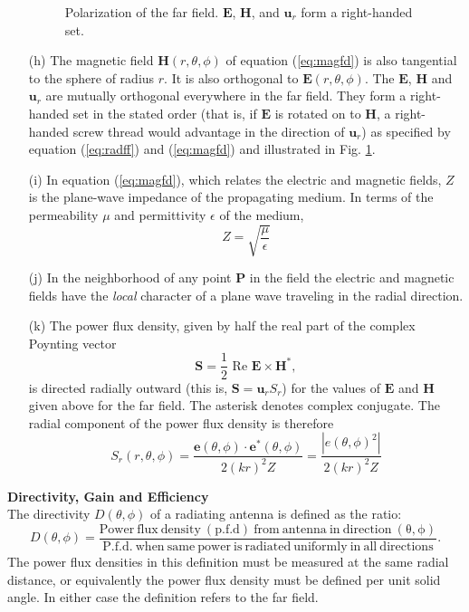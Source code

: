 \begin{itemize}
\begin{figure}[htbp]
\begin{center}
		\end{center}
		\caption{Polarization of the far field. $\mathbf{E}$, $\mathbf{H}$, and $\mathbf{u}_r$ form a right-handed set.} 
		\label{fig:pol-rh}
	\end{figure}
	\item [(h)]
	The magnetic field $\mathbf{H}(r,\theta,\phi)$ of equation (\ref{eq:magfd}) is also tangential to the sphere of radius $r$. It is also orthogonal to $\mathbf{E}(r,\theta,\phi)$. The $\mathbf{E}$, $\mathbf{H}$ and $\mathbf{u}_r$ are mutually orthogonal everywhere in the far field. They form a right-handed set in the stated order (that is, if $\mathbf{E}$ is rotated on to $\mathbf{H}$, a right-handed screw thread would advantage in the direction of $\mathbf{u}_r$) as specified by equation (\ref{eq:radff}) and (\ref{eq:magfd}) and illustrated in Fig. \ref{fig:pol-rh}.
	\item [(i)]
	In equation (\ref{eq:magfd}), which relates the electric and magnetic fields, $Z$ is the plane-wave impedance of the propagating medium. In terms of the permeability $\mu$ and permittivity $\epsilon$ of the medium,
	\begin{equation}
	Z = \sqrt{\dfrac{\mu}{\epsilon}}
	\end{equation}
	\item [(j)]
	In the neighborhood of any point $\mathbf{P}$ in the field the electric and magnetic fields have the {\itshape local} character of a plane wave traveling in the radial direction.
	\item [(k)]
	The power flux density, given by half the real part of the complex Poynting vector
	\begin{equation}
	\mathbf{S}=\frac{1}{2}\text{ Re }\mathbf{E}\times\mathbf{H^*},
	\end{equation}
	is directed radially outward (this is, $\mathbf{S}=\mathbf{u}_rS_r$) for the values of $\mathbf{E}$ and $\mathbf{H}$ given above for the far field. The asterisk denotes complex conjugate. The radial component of the power flux density is therefore
	\begin{equation}
	S_r(r,\theta,\phi)=\dfrac{\mathbf{e}(\theta,\phi)\cdot\mathbf{e}^*(\theta,\phi)}{2(kr)^2Z}=\dfrac{|e(\theta,\phi)^2|}{2(kr)^2Z}
	\end{equation}
\end{itemize}
\textbf{Directivity, Gain and Efficiency}\\
The directivity $D(\theta,\phi)$ of a radiating antenna is defined as the ratio:\\
\begin{equation}
D(\theta,\phi)=\frac{\mathrm{Power\ flux\ density\ (p.f.d)\ from\ antenna\ in\ direction\ (\theta,\phi)}}{\mathrm{P.f.d.\ when\ same\ power\ is\ radiated\ uniformly\ in\ all\ directions}}.
\label{eq:dir}
\end{equation}
The power flux densities in this definition must be measured at the same radial distance, or equivalently the power flux density must be defined per unit solid angle. In either case the definition refers to the far field.

